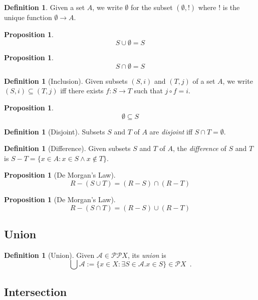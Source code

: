\documentclass{book}
\newtheorem{prop}[ax]{Proposition}
\theoremstyle{definition}
\newtheorem{df}[ax]{Definition}
\begin{document}
\begin{df}
Given a set $A$, we write $\emptyset$ for the subset $(\emptyset, !)$ where $!$ is the unique function $\emptyset \rightarrow A$.
\end{df}

\begin{prop}
\[ S \cup \emptyset = S \]
\end{prop}

\begin{prop}
\[ S \cap \emptyset = S \]
\end{prop}

\begin{df}[Inclusion]
Given subsets $(S,i)$ and $(T,j)$ of a set $A$, we write $(S,i) \subseteq (T,j)$ iff there exists $f : S \rightarrow T$ such that $j \circ f = i$.
\end{df}

\begin{prop}
\[ \emptyset \subseteq S \]
\end{prop}

\begin{df}[Disjoint]
Subsets $S$ and $T$ of $A$ are \emph{disjoint} iff $S \cap T = \emptyset$.
\end{df}

\begin{df}[Difference]
Given subsets $S$ and $T$ of $A$, the \emph{difference} of $S$ and $T$ is $S - T = \{ x \in A : x \in S \wedge x \notin T \}$.
\end{df}

\begin{prop}[De Morgan's Law]
\[ R - (S \cup T) = (R - S) \cap (R - T) \]
\end{prop}

\begin{prop}[De Morgan's Law]
\[ R - (S \cap T) = (R - S) \cup (R - T) \]
\end{prop}

\subsection{Union} %

\begin{df}[Union]
Given $\mathcal{A} \in \mathcal{P} \mathcal{P} X$, its \emph{union} is
\[ \bigcup \mathcal{A} := \{ x \in X : \exists S \in \mathcal{A}. x \in S \} \in \mathcal{P} X \enspace . \]
\end{df}

\subsection{Intersection} %
\end{document}
